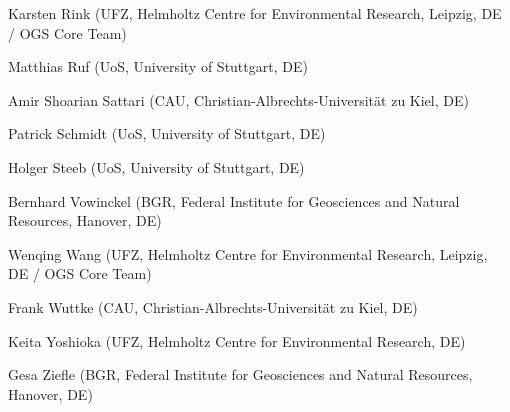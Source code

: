 \begin{list}{-}{\leftmargin=1em \itemindent=0em \itemsep=0.1em}
\item Karsten Rink (UFZ, Helmholtz Centre for Environmental Research, Leipzig, DE / OGS Core Team) 
\item Matthias Ruf (UoS, University of Stuttgart, DE)
\item Amir Shoarian Sattari (CAU, Christian-Albrechts-Universität zu Kiel, DE)
\item Patrick Schmidt (UoS, University of Stuttgart, DE)	
\item Holger Steeb (UoS, University of Stuttgart, DE)	
\item Bernhard Vowinckel (BGR, Federal Institute for Geosciences and Natural Resources, Hanover, DE)	\item Wenqing Wang (UFZ, Helmholtz Centre for Environmental Research, Leipzig, DE / OGS Core Team) 
\item Frank Wuttke (CAU, Christian-Albrechts-Universität zu Kiel, DE)	
\item Keita Yoshioka (UFZ, Helmholtz Centre for Environmental Research, DE) 
\item Gesa Ziefle (BGR, Federal Institute for Geosciences and Natural Resources, Hanover, DE)	
\end{list}